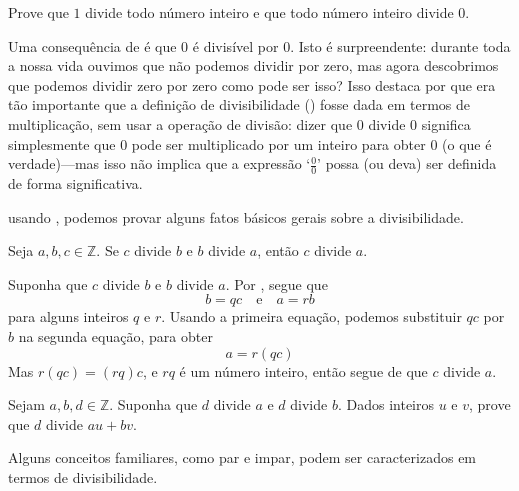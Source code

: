 \begin{exercise}
\label{exOneDividesEveryIntegerDividesZero}
Prove que $1$ divide todo número inteiro e que todo número inteiro divide $0$.
\end{exercise}

Uma consequência de  é que $0$ é divisível por $0$. Isto é surpreendente: durante toda a nossa vida ouvimos que não podemos dividir por zero, mas agora descobrimos que podemos dividir zero por zero\points{} como pode ser isso? Isso destaca por que era tão importante que a definição de divisibilidade () fosse dada em termos de multiplicação, sem usar a operação de divisão: dizer que $0$ divide $0$ significa simplesmente que $0$ pode ser multiplicado por um inteiro para obter $0$ (o que é verdade)---mas isso não implica que a expressão `$\frac{0}{0}$' possa (ou deva) ser definida de forma significativa.

usando , podemos provar alguns fatos básicos gerais sobre a divisibilidade.


\begin{proposition}
\label{propDivisibilityIsTransitive}
Seja $a,b,c \in \mathbb{Z}$. Se $c$ divide $b$ e $b$ divide $a$, então $c$ divide $a$.
\end{proposition}

\begin{cproof}


Suponha que $c$ divide $b$ e $b$ divide $a$. Por , segue que
\[ b=qc \quad \text{e} \quad a=rb \]
para alguns inteiros $q$ e $r$. Usando a primeira equação, podemos substituir $qc$ por $b$ na segunda equação, para obter
\[ a=r(qc) \]
Mas $r(qc) = (rq)c$, e $rq$ é um número inteiro, então segue de  que $c$ divide $a$.
\end{cproof}


\begin{exercise}
\label{exDivisibilityIsLinear}
Sejam $a,b,d \in \mathbb{Z}$. Suponha que $d$ divide $a$ e $d$ divide $b$. Dados inteiros $u$ e $v$, prove que $d$ divide $au+bv$.
\end{exercise}

Alguns conceitos familiares, como par e impar, podem ser caracterizados em termos de divisibilidade.

